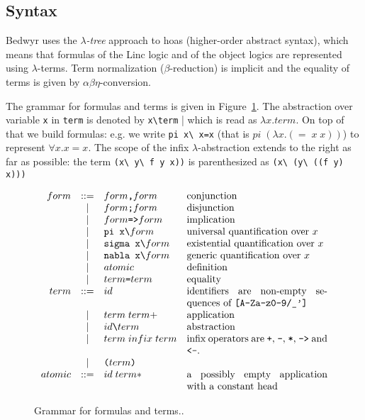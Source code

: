 \documentclass{article}
\begin{document}
\subsection{Syntax}

Bedwyr uses the {\em $\lambda$-tree} approach \cite{miller00cl} to
hoas (higher-order abstract syntax), which means that formulas of the
Linc logic and of the object logics are represented using
$\lambda$-terms.  Term normalization ($\beta$-reduction) is implicit
and the equality of terms is given by $\alpha\beta\eta$-conversion.

The grammar for formulas and terms is given in Figure~\ref{concrete}.
The abstraction over variable \verb.x. in \verb.term. is denoted by
\verb.x\term. | which is read as $\lambda x. term$. On top of that we
build formulas: e.g. we write \verb.pi x\ x=x.  (that is
$pi\;(\lambda{}x.(=\;x\;x))$) to represent $\forall x. x=x$.  The
scope of the infix $\lambda$-abstraction extends to the right as far
as possible: the term \verb.(x\ y\ f y x)). is parenthesized as 
\verb.(x\ (y\ ((f y) x))).

\begin{figure}
\[\begin{array}{rclp{5cm}}
form &::=& form \texttt{,}  form & conjunction \\
     & | & form \texttt{;}  form & disjunction \\
     & | & form \texttt{=>} form & implication \\
     & | & \verb.pi x\.    form  & universal quantification over $x$ \\
     & | & \verb.sigma x\. form  & existential quantification over $x$ \\
     & | & \verb.nabla x\. form  & generic quantification over $x$ \\
     & | & atomic & definition \\
     & | & term \verb.=. term & equality \\
term &::=& id & identifiers are non-empty sequences of \verb.[A-Za-z0-9/_']. \\
     & | & term \; term+ & application \\
     & | & id \verb.\. term & abstraction \\
     & | & term \; infix \; term & infix operators are
             \verb.+., \verb.-., \verb.*., \verb.->. and \verb.<-.. \\
     & | & \verb.(. term \verb.). & \\
atomic &::=& id \; term* & a possibly empty application with a constant head \\
\end{array}\]
\caption{Grammar for formulas and terms..}
\label{concrete}
\end{figure}
\end{document}
